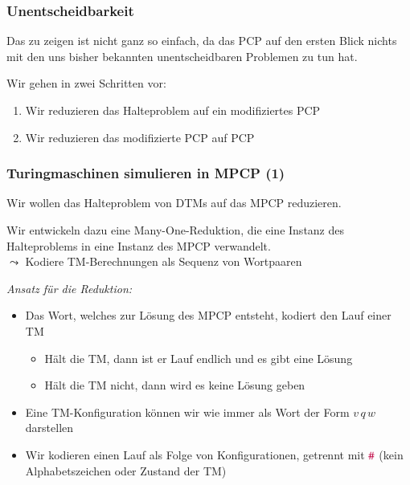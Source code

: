 \documentclass[aspectratio=1610,onlymath]{beamer}
\begin{document}
\begin{frame}\frametitle{Unentscheidbarkeit}

\pause

Das zu zeigen ist nicht ganz so einfach, da das PCP auf den ersten Blick
nichts mit den uns bisher bekannten unentscheidbaren Problemen zu tun hat.
\bigskip

Wir gehen in zwei Schritten vor:
\begin{enumerate}[(1)]
\item Wir reduzieren das Halteproblem auf ein \alert{modifiziertes PCP}
\item Wir reduzieren das modifizierte PCP auf PCP
\end{enumerate}\bigskip\pause


\end{frame}

\begin{frame}\frametitle{Turingmaschinen simulieren in MPCP (1)}

Wir wollen das Halteproblem von DTMs auf das MPCP reduzieren.\medskip

Wir entwickeln dazu eine \alert{Many-One-Reduktion}, die eine Instanz des Halteproblems
in eine Instanz des MPCP verwandelt.\\
$\leadsto$ Kodiere TM-Berechnungen als Sequenz von Wortpaaren
\bigskip\pause

\emph{Ansatz für die Reduktion:}
\begin{itemize}
\item Das Wort, welches zur Lösung des MPCP entsteht, kodiert den Lauf einer TM
\begin{itemize}
\item Hält die TM, dann ist er Lauf endlich und es gibt eine Lösung
\item Hält die TM nicht, dann wird es keine Lösung geben
\end{itemize}
\item Eine TM-Konfiguration können wir wie immer als Wort der Form $v\, q\, w$ darstellen
\item Wir kodieren einen Lauf als Folge von Konfigurationen, getrennt mit $\mathtt{\textcolor{purple}{\#}}$ (kein Alphabetszeichen oder Zustand der TM)
\end{itemize}

\end{frame}
\end{document}
